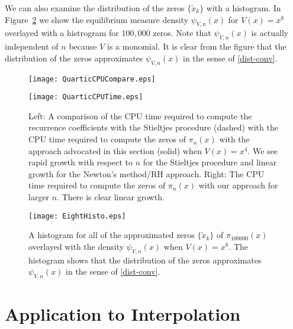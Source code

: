 \documentclass[final]{siamltex}
\begin{document}
We can also examine the distribution of the zeros $\{\tilde x_k\}$ with a histogram.  In Figure~\ref{EightHisto} we show the equilibrium measure density $\psi_{V,n}(x)$ for $V(x) = x^8$ overlayed with a histrogram for $100,\! 000$  zeros.  Note that $\psi_{V,n}(x)$ is actually independent of $n$ because $V$ is a monomial.  It is clear from the figure that the distribution of the zeros approximates $\psi_{V,n}(x)$ in the sense of \eqref{dist-conv}.

\begin{figure}[tbp]
\centering
\begin{minipage}{.49\textwidth}
 \texttt{[image: QuarticCPUCompare.eps]}
\end{minipage}
\begin{minipage}{.49\textwidth}
\texttt{[image: QuarticCPUTime.eps]}
\end{minipage}
\caption{Left: A comparison of the CPU time required to compute the recurrence coefficients with the Stieltjes procedure (dashed) with the CPU time required to compute the zeros of $\pi_n(x)$ with the approach advocated in this section (solid) when $V(x) = x^4$.  We see rapid growth with respect to $n$ for the Stieltjes procedure and linear growth for the Newton's method/RH approach.  Right: The CPU time required to compute the zeros of $\pi_n(x)$ with our approach for larger $n$.  There is clear linear growth. \label{RHCPUTime}}
\end{figure}

\begin{figure}[tbp]
\centering
\texttt{[image: EightHisto.eps]}
\caption{A histogram for all of the approximated zeros $\{\tilde x_k\}$ of $\pi_{100000}(x)$ overlayed with the density $\psi_{V,n}(x)$ when $V(x) = x^8$.  The histogram shows that the distribution of the zeros approximates $\psi_{V,n}(x)$ in the sense of \eqref{dist-conv}. \label{EightHisto}}
\end{figure}

\section{Application to Interpolation}\label{sec:interpolation} 
\end{document}
